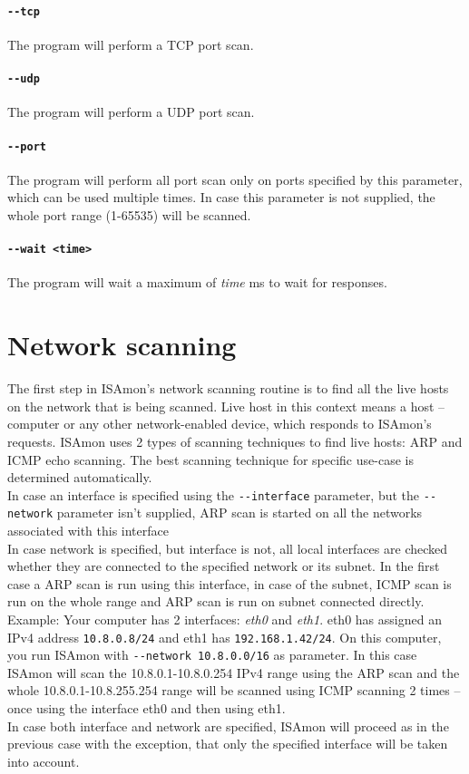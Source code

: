 \documentclass[11pt,a4paper]{article}
\begin{document}
		\paragraph{\texttt{-{}-tcp}} The program will perform a TCP port scan.
		\vspace{-0.5cm}
		\paragraph{\texttt{-{}-udp}} The program will perform a UDP port scan.
		\vspace{-0.5cm}
		\paragraph{\texttt{-{}-port}} The program will perform all port scan only on ports specified by this parameter, which can be used multiple times. In case this parameter is not supplied, the whole port range (1-65535) will be scanned.
		\vspace{-0.5cm}
		\paragraph{\texttt{-{}-wait <time>}} The program will wait a maximum of \emph{time} ms to wait for responses.

\section{Network scanning}
	The first step in ISAmon's network scanning routine is to find all the live hosts on the network that is being scanned. Live host in this context means a host -- computer or any other network-enabled device, which responds to ISAmon's requests. ISAmon uses 2 types of scanning techniques to find live hosts: ARP and ICMP echo scanning. The best scanning technique for specific use-case is determined automatically.\\
	In case an interface is specified using the \texttt{-{}-interface} parameter, but the \texttt{-{}-network} parameter isn't supplied, ARP scan is started on all the networks associated with this interface\\
	In case network is specified, but interface is not, all local interfaces are checked whether they are connected to the specified network or its subnet. In the first case a ARP scan is run using this interface, in case of the subnet, ICMP scan is run on the whole range and ARP scan is run on subnet connected directly. Example: Your computer has 2 interfaces: \emph{eth0} and \emph{eth1}. eth0 has assigned an IPv4 address \texttt{10.8.0.8/24} and eth1 has \texttt{192.168.1.42/24}. On this computer, you run ISAmon with \texttt{-{}-network 10.8.0.0/16} as parameter. In this case ISAmon will scan the 10.8.0.1-10.8.0.254 IPv4 range using the ARP scan and the whole 10.8.0.1-10.8.255.254 range will be scanned using ICMP scanning 2 times -- once using the interface eth0 and then using eth1.\\
	In case both interface and network are specified, ISAmon will proceed as in the previous case with the exception, that only the specified interface will be taken into account.
\end{document}
